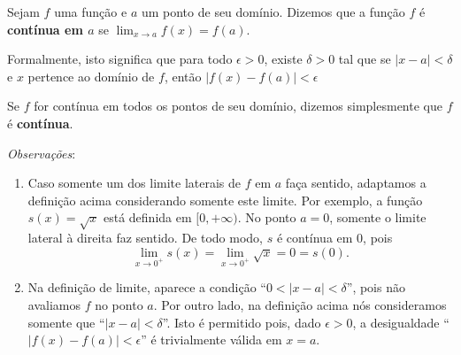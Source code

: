 \begin{definition}
	Sejam $f$ uma função e $a$ um ponto de seu domínio. Dizemos que a função $f$ é \textbf{contínua em $a$} se $\lim_{x\to a}f(x)=f(a)$. 
	
	Formalmente, isto significa que para todo $\epsilon>0$, existe $\delta>0$ tal que se $|x-a|<\delta$ e $x$ pertence ao domínio de $f$, então $|f(x)-f(a)|<\epsilon$
	
	Se $f$ for contínua em todos os pontos de seu domínio, dizemos simplesmente que $f$ é \textbf{contínua}.
\end{definition}

\textit{Observações}:
\begin{enumerate}
	\item Caso somente um dos limite laterais de $f$ em $a$ faça sentido, adaptamos a definição acima considerando somente este limite. Por exemplo, a função $s(x)=\sqrt{x}$ está definida em $[0,+\infty)$. No ponto $a=0$, somente o limite lateral à direita faz sentido. De todo modo, $s$ é contínua em $0$, pois
	\[\lim_{x\to 0^+}s(x)=\lim_{x\to 0^+}\sqrt{x}=0=s(0).\]
	\item Na definição de limite, aparece a condição ``$0<|x-a|<\delta$'', pois não avaliamos $f$ no ponto $a$. Por outro lado, na definição acima nós consideramos somente que ``$|x-a|<\delta$''. Isto é permitido pois, dado $\epsilon>0$, a desigualdade ``$|f(x)-f(a)|<\epsilon$'' é trivialmente válida em $x=a$.
\end{enumerate}
